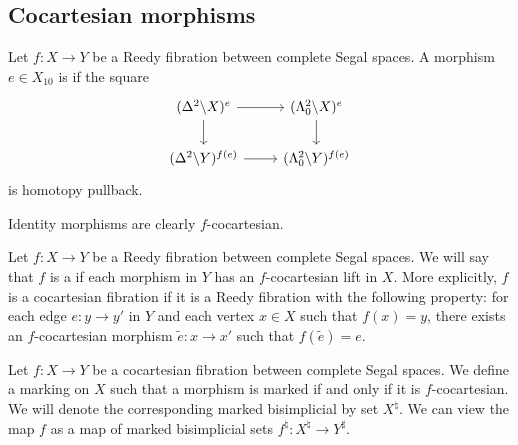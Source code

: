 \documentclass[main.tex]{subfiles}
\begin{document}
\subsection{Cocartesian morphisms}
\label{ssc:cocartesian_morphisms}

\begin{definition}
  Let $f\colon X \to Y$ be a Reedy fibration between complete Segal spaces. A morphism $e \in X_{10}$ is  if the square
  \begin{equation*}
    \begin{tikzcd}
      (\Delta^{2} \backslash X)^{e}
      \arrow[r]
      \arrow[d]
      & (\Lambda^{2}_{0} \backslash X)^{e}
      \arrow[d]
      \\
      (\Delta^{2} \backslash Y)^{f(e)}
      \arrow[r]
      & (\Lambda^{2}_{0} \backslash Y)^{f(e)}
    \end{tikzcd}
  \end{equation*}
  is homotopy pullback.
\end{definition}

\begin{example}
  Identity morphisms are clearly $f$-cocartesian.
\end{example}

\begin{definition}
  \label{def:cocartesian_fibration_between_complete_segal_spaces}
  Let $f\colon X \to Y$ be a Reedy fibration between complete Segal spaces. We will say that $f$ is a  if each morphism in $Y$ has an $f$-cocartesian lift in $X$. More explicitly, $f$ is a cocartesian fibration if it is a Reedy fibration with the following property: for each edge $e\colon y \to y'$ in $Y$ and each vertex $x \in X$ such that $f(x) = y$, there exists an $f$-cocartesian morphism $\tilde{e}\colon x \to x'$ such that $f(\tilde{e}) = e$.
\end{definition}

\begin{definition}
  \label{def:cocoartesian_marking_on_complete_segal_spaces}
  Let $f\colon X \to Y$ be a cocartesian fibration between complete Segal spaces. We define a marking on $X$ such that a morphism is marked if and only if it is $f$-cocartesian. We will denote the corresponding marked bisimplicial by set $X^{\natural}$. We can view the map $f$ as a map of marked bisimplicial sets $f^{\natural}\colon X^{\natural} \to Y^{\sharp}$.
\end{definition}
\end{document}
